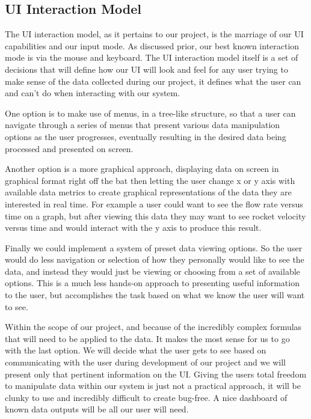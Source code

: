 \documentclass[10pt,draftclsnofoot,onecolumn]{IEEEtran}
\begin{document}
\subsection{UI Interaction Model}
The UI interaction model, as it pertains to our project, is the marriage of our UI capabilities and our input mode. As discussed prior, our best known interaction mode is via the mouse and keyboard. The UI interaction model itself is a set of decisions that will define how our UI will look and feel for any user trying to make sense of the data collected during our project, it defines what the user can and can't do when interacting with our system.\par
One option is to make use of menus, in a tree-like structure, so that a user can navigate through a series of menus that present various data manipulation options as the user progresses, eventually resulting in the desired data being processed and presented on screen.\par
Another option is a more graphical approach, displaying data on screen in graphical format right off the bat then letting the user change x or y axis with available data metrics to create graphical representations of the data they are interested in real time. For example a user could want to see the flow rate versus time on a graph, but after viewing this data they may want to see rocket velocity versus time and would interact with the y axis to produce this result.\par
Finally we could implement a system of preset data viewing options. So the user would do less navigation or selection of how they personally would like to see the data, and instead they would just be viewing or choosing from a set of available options. This is a much less hands-on approach to presenting useful information to the user, but accomplishes the task based on what we know the user will want to see.\par
Within the scope of our project, and because of the incredibly complex formulas that will need to be applied to the data. It makes the most sense for us to go with the last option. We will decide what the user gets to see based on communicating with the user during development of our project and we will present only that pertinent information on the UI. Giving the users total freedom to manipulate data within our system is just not a practical approach, it will be clunky to use and incredibly difficult to create bug-free. A nice dashboard of known data outputs will be all our user will need.\par
\end{document}
